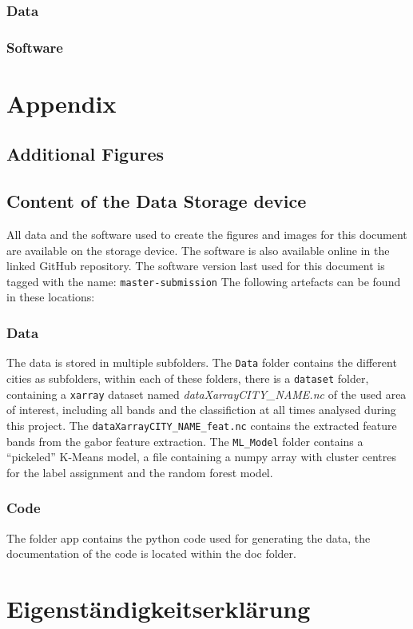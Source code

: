 \documentclass[12pt,a4paper, english,twoside]{article}
\begin{document}
\subsubsection{Data}


\subsubsection{Software}


\newpage
\section{Appendix}
  \subsection{Additional Figures}
  \missingfigure{}
  \subsection{Content of the Data Storage device}
    All data and the software used to create the figures and images for this document are available on the storage device.
    The software is also available online in the linked GitHub repository.
    The software version last used for this document is tagged with the name: \texttt{master-submission}
    The following artefacts can be found in these locations:
  \subsubsection{Data}
    The data is stored in multiple subfolders. 
    The \texttt{Data} folder contains the different cities as subfolders, within each of these folders, there is a \texttt{dataset} folder, containing a \texttt{xarray} dataset named \textit{dataXarrayCITY\_NAME.nc} of the used area of interest, including all bands and the classifiction at all times analysed during this project. 
    The \texttt{dataXarrayCITY\_NAME\_feat.nc} contains the extracted feature bands from the gabor feature extraction.
    The \texttt{ML\_Model} folder contains a ``pickeled'' K-Means model, a file containing a numpy array with cluster centres for the label assignment and the random forest model. 
  \subsubsection{Code}
    The folder app contains the python code used for generating the data, the documentation of the code is located within the doc folder.
\newpage
\printbibliography%
\newpage
\section*{Eigenständigkeitserklärung}

\end{document}
